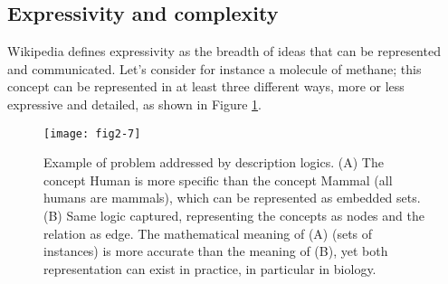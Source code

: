 \subsection{Expressivity and complexity}
\label{complexity}

Wikipedia defines expressivity as the breadth of ideas that can be represented and communicated. Let’s consider for instance a molecule of methane; this concept can be represented in at least three different ways, more or less expressive and detailed, as shown in Figure \ref{fig2-7}.

\begin{figure}[ht]
    \centering
    \texttt{[image: fig2-7]}
    \caption{Example of problem addressed by description logics. (A) The concept Human is more specific than the concept Mammal (all humans are mammals), which can be represented as embedded sets. (B) Same logic captured, representing the concepts as nodes and the relation as edge. The mathematical meaning of (A) (sets of instances) is more accurate than the meaning of (B), yet both representation can exist in practice, in particular in biology.}
    \label{fig2-7}
\end{figure}

